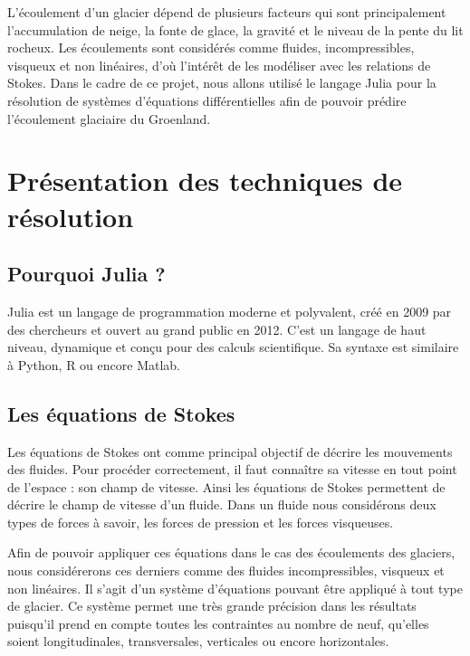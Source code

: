 \documentclass{article}
\begin{document}
L’écoulement d’un glacier dépend de plusieurs facteurs qui sont principalement l’accumulation de neige, la fonte de glace, la gravité et le niveau de la pente du lit rocheux.
Les écoulements sont considérés comme fluides, incompressibles, visqueux et non linéaires, d’où l’intérêt de les modéliser avec les relations de Stokes.
Dans le cadre de ce projet, nous allons utilisé le langage Julia pour la résolution de systèmes d'équations différentielles afin de pouvoir prédire l'écoulement glaciaire du Groenland.


\section{Présentation des techniques de résolution}

\subsection{Pourquoi Julia ?}

Julia est un langage de programmation moderne et polyvalent, créé en 2009 par des chercheurs et ouvert au grand public en 2012. C'est un langage de haut niveau, dynamique et conçu pour des calculs scientifique. Sa syntaxe est similaire à Python, R ou encore Matlab.
 


\subsection{Les équations de Stokes}

Les équations de Stokes \cite{site1} ont comme principal objectif de décrire les mouvements des fluides. 
Pour procéder correctement, il faut connaître sa vitesse en tout point de l'espace : son champ de vitesse. Ainsi les équations de Stokes permettent de décrire le champ de vitesse d'un fluide. 
Dans un fluide nous considérons deux types de forces à savoir, les forces de pression et les forces visqueuses. 

Afin de pouvoir appliquer ces équations dans le cas des écoulements des glaciers, nous considérerons ces derniers comme des fluides incompressibles, visqueux et non linéaires. Il s'agit d'un système d'équations pouvant être appliqué à tout type de glacier.
\newpage
Ce système permet une très grande précision dans les résultats puisqu'il prend en compte toutes les contraintes au nombre de neuf, qu’elles soient longitudinales, transversales, verticales ou encore horizontales. 
\end{document}
